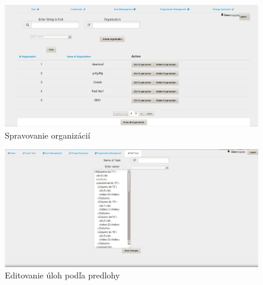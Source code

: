 {\begin{figure}[htb]

\begin{center}

\includegraphics[scale=0.5]{page4.jpg} 
\caption{Spravovanie organizácií}


\end{center}

\end{figure}

\begin{figure}[htb]

\begin{center}

\includegraphics[scale=0.5]{page6.jpg} 
\caption{Editovanie úloh podľa predlohy}


\end{center}

\end{figure}



}

